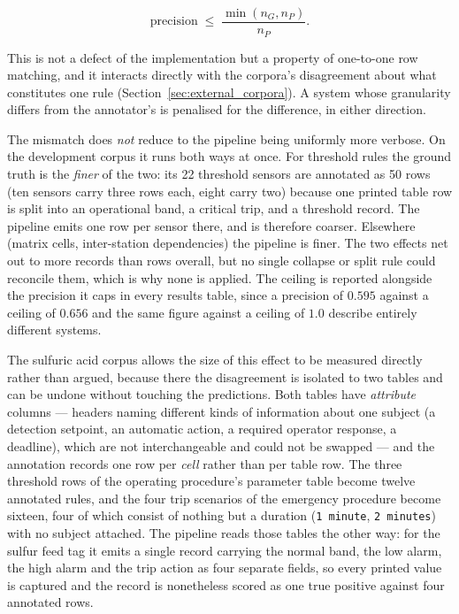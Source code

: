 \documentclass[11pt]{article}
\begin{document}
\begin{equation}
\label{eq:ceiling}
\mathrm{precision} \;\le\; \frac{\min(n_G, n_P)}{n_P}.
\end{equation}

This is not a defect of the implementation but a property of one-to-one row
matching, and it interacts directly with the corpora's disagreement about what
constitutes one rule (Section~\ref{sec:external_corpora}). A system whose
granularity differs from the annotator's is penalised for the difference, in
either direction.

The mismatch does \emph{not} reduce to the pipeline being uniformly more verbose. On the development corpus it runs both ways at once.
For threshold rules the ground truth is the \emph{finer} of the two: its 22
threshold sensors are annotated as 50 rows (ten sensors carry three rows each,
eight carry two) because one printed table row is split into an operational
band, a critical trip, and a threshold record. The pipeline emits one row per
sensor there, and is therefore coarser. Elsewhere (matrix cells, inter-station
dependencies) the pipeline is finer. The two effects net out to more records
than rows overall, but no single collapse or split rule could reconcile them,
which is why none is applied. The
ceiling is reported alongside the precision it caps in every results table, since
a precision of $0.595$ against a ceiling of $0.656$ and the same figure against a
ceiling of $1.0$ describe entirely different systems.

The sulfuric acid corpus allows the size of this effect to be measured directly
rather than argued, because there the disagreement is isolated to two tables and
can be undone without touching the predictions. Both tables have
\emph{attribute} columns --- headers naming different kinds of information about
one subject (a detection setpoint, an automatic action, a required operator
response, a deadline), which are not interchangeable and could not be swapped
--- and the annotation records one row per \emph{cell} rather than per table
row. The three threshold rows of the operating procedure's parameter table
become twelve annotated rules, and the four trip scenarios of the emergency
procedure become sixteen, four of which consist of nothing but a duration
(\texttt{1 minute}, \texttt{2 minutes}) with no subject attached. The pipeline
reads those tables the other way: for the sulfur feed tag it emits a single
record carrying the normal band, the low alarm, the high alarm and the trip
action as four separate fields, so every printed value is captured and the
record is nonetheless scored as one true positive against four annotated rows.
\end{document}
